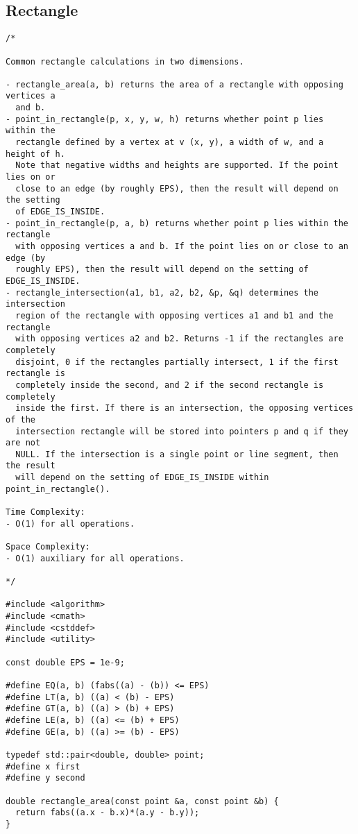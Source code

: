 \subsection{Rectangle}
\begin{lstlisting}
/*

Common rectangle calculations in two dimensions.

- rectangle_area(a, b) returns the area of a rectangle with opposing vertices a
  and b.
- point_in_rectangle(p, x, y, w, h) returns whether point p lies within the
  rectangle defined by a vertex at v (x, y), a width of w, and a height of h.
  Note that negative widths and heights are supported. If the point lies on or
  close to an edge (by roughly EPS), then the result will depend on the setting
  of EDGE_IS_INSIDE.
- point_in_rectangle(p, a, b) returns whether point p lies within the rectangle
  with opposing vertices a and b. If the point lies on or close to an edge (by
  roughly EPS), then the result will depend on the setting of EDGE_IS_INSIDE.
- rectangle_intersection(a1, b1, a2, b2, &p, &q) determines the intersection
  region of the rectangle with opposing vertices a1 and b1 and the rectangle
  with opposing vertices a2 and b2. Returns -1 if the rectangles are completely
  disjoint, 0 if the rectangles partially intersect, 1 if the first rectangle is
  completely inside the second, and 2 if the second rectangle is completely
  inside the first. If there is an intersection, the opposing vertices of the
  intersection rectangle will be stored into pointers p and q if they are not
  NULL. If the intersection is a single point or line segment, then the result
  will depend on the setting of EDGE_IS_INSIDE within point_in_rectangle().

Time Complexity:
- O(1) for all operations.

Space Complexity:
- O(1) auxiliary for all operations.

*/

#include <algorithm>
#include <cmath>
#include <cstddef>
#include <utility>

const double EPS = 1e-9;

#define EQ(a, b) (fabs((a) - (b)) <= EPS)
#define LT(a, b) ((a) < (b) - EPS)
#define GT(a, b) ((a) > (b) + EPS)
#define LE(a, b) ((a) <= (b) + EPS)
#define GE(a, b) ((a) >= (b) - EPS)

typedef std::pair<double, double> point;
#define x first
#define y second

double rectangle_area(const point &a, const point &b) {
  return fabs((a.x - b.x)*(a.y - b.y));
}


\end{lstlisting}
